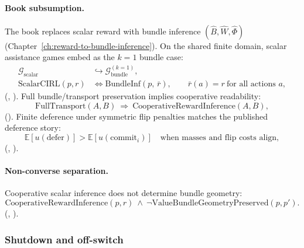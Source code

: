 \paragraph{Book subsumption.}
The book replaces scalar reward with bundle inference \((\hat B,\hat W,\hat\Phi)\) (Chapter~\ref{ch:reward-to-bundle-inference}).
On the shared finite domain, scalar assistance games embed as the \(k=1\) bundle case:
\begin{align}
\mathcal G_{\mathrm{scalar}} &\hookrightarrow \mathcal G_{\mathrm{bundle}}^{(k=1)},
\label{appi:eq:cirl-k1-embed}\\
\text{ScalarCIRL}(p,r) &\iff \text{BundleInf}(p,\,\bar r),
\qquad \bar r(a)=r\ \text{for all actions }a,
\label{appi:eq:cirl-scalar-bundle}
\end{align}
(, ).
Full bundle/transport preservation implies cooperative readability:
\begin{equation}
\label{appi:eq:cirl-transport-forward}
\text{FullTransport}(A,B)\ \Rightarrow\ \text{CooperativeRewardInference}(A,B),
\end{equation}
().
Finite deference under symmetric flip penalties matches the published deference story:
\begin{equation}
\label{appi:eq:cirl-defer}
\mathbb E[u(\text{defer})]>\mathbb E[u(\text{commit}_i)]
\quad\text{when masses and flip costs align},
\end{equation}
(, ).

\paragraph{Non-converse separation.}
Cooperative scalar inference does not determine bundle geometry:
\begin{equation}
\label{appi:eq:cirl-separation}
\text{CooperativeRewardInference}(p,r)\ \wedge\ \neg\text{ValueBundleGeometryPreserved}(p,p').
\end{equation}
(, ).

\subsubsection{Shutdown and off-switch \autocite{soares2015corrigibility,thornley2023shutdown}}
\label{sec:appi-field-shutdown}

